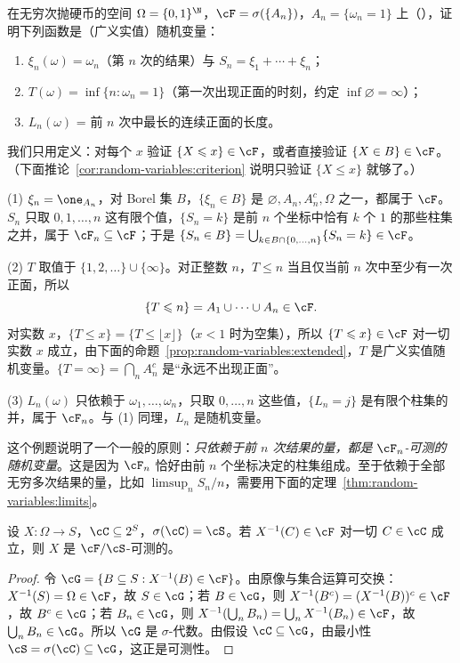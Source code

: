 \begin{workedexample}\label{we:random-variables:coin}
在无穷次抛硬币的空间 $\Omega=\{0,1\}^\N$，$\cF=\sigma(\{A_n\})$，$A_n=\{\omega_n=1\}$ 上（），证明下列函数是（广义实值）随机变量：
\begin{enumerate}
\item $\xi_n(\omega)=\omega_n$（第 $n$ 次的结果）与 $S_n=\xi_1+\cdots+\xi_n$；
\item $T(\omega)=\inf\{n:\omega_n=1\}$（第一次出现正面的时刻，约定 $\inf\varnothing=\infty$）；
\item $L_n(\omega)$ = 前 $n$ 次中最长的连续正面的长度。
\end{enumerate}
\end{workedexample}
\begin{solution}
我们只用定义：对每个 $x$ 验证 $\{X\leqslant x\}\in\cF$，或者直接验证 $\{X\in B\}\in\cF$。（下面推论~\ref{cor:random-variables:criterion} 说明只验证 $\{X\leqslant x\}$ 就够了。）

(1) $\xi_n=\one_{A_n}$，对 Borel 集 $B$，$\{\xi_n\in B\}$ 是 $\varnothing,A_n,A_n^c,\Omega$ 之一，都属于 $\cF$。$S_n$ 只取 $0,1,\dots,n$ 这有限个值，$\{S_n=k\}$ 是前 $n$ 个坐标中恰有 $k$ 个 $1$ 的那些柱集之并，属于 $\cF_n\subseteq\cF$；于是 $\{S_n\in B\}=\bigcup_{k\in B\cap\{0,\dots,n\}}\{S_n=k\}\in\cF$。

(2) $T$ 取值于 $\{1,2,\dots\}\cup\{\infty\}$。对正整数 $n$，$T\leqslant n$ 当且仅当前 $n$ 次中至少有一次正面，所以
\[
\{T\leqslant n\}=A_1\cup\cdots\cup A_n\in\cF .
\]
对实数 $x$，$\{T\leqslant x\}=\{T\leqslant\lfloor x\rfloor\}$（$x<1$ 时为空集），所以 $\{T\leqslant x\}\in\cF$ 对一切实数 $x$ 成立，由下面的命题~\ref{prop:random-variables:extended}，$T$ 是广义实值随机变量。$\{T=\infty\}=\bigcap_nA_n^c$ 是“永远不出现正面”。

(3) $L_n(\omega)$ 只依赖于 $\omega_1,\dots,\omega_n$，只取 $0,\dots,n$ 这些值，$\{L_n=j\}$ 是有限个柱集的并，属于 $\cF_n$。与 (1) 同理，$L_n$ 是随机变量。

这个例题说明了一个一般的原则：\emph{只依赖于前 $n$ 次结果的量，都是 $\cF_n$-可测的随机变量}。这是因为 $\cF_n$ 恰好由前 $n$ 个坐标决定的柱集组成。至于依赖于全部无穷多次结果的量，比如 $\limsup_nS_n/n$，需要用下面的定理~\ref{thm:random-variables:limits}。
\end{solution}

\begin{theorem}[在生成元上验证可测性]\label{thm:random-variables:generators}
设 $X:\Omega\to S$，$\cC\subseteq2^S$，$\sigma(\cC)=\cS$。若 $X^{-1}(C)\in\cF$ 对一切 $C\in\cC$ 成立，则 $X$ 是 $\cF/\cS$-可测的。
\end{theorem}
\begin{proof}
令 $\cG=\{B\subseteq S: X^{-1}(B)\in\cF\}$。由原像与集合运算可交换：$X^{-1}(S)=\Omega\in\cF$，故 $S\in\cG$；若 $B\in\cG$，则 $X^{-1}(B^c)=(X^{-1}(B))^c\in\cF$，故 $B^c\in\cG$；若 $B_n\in\cG$，则 $X^{-1}(\bigcup_nB_n)=\bigcup_nX^{-1}(B_n)\in\cF$，故 $\bigcup_nB_n\in\cG$。所以 $\cG$ 是 $\sigma$-代数。由假设 $\cC\subseteq\cG$，由最小性 $\cS=\sigma(\cC)\subseteq\cG$，这正是可测性。
\end{proof}

